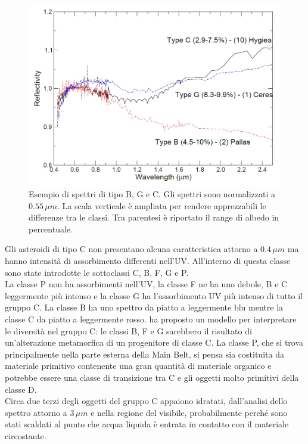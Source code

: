 \documentclass[a4paper,11pt,openright]{book}
\begin{document}
\begin{figure}[!h]
    \centering
    \includegraphics[scale=0.3]{figure/spettro_bgc.jpg}
    \caption[Esempio di spettri di tipo B, G e C.]{Esempio di spettri di tipo B, G e C. Gli spettri sono normalizzati a $0.55\,\mu m$. La scala verticale è ampliata per rendere apprezzabili le differenze tra le classi. Tra parentesi è riportato il range di albedo in percentuale. \citep{magrin_spectroscopic_nodate}}
    \label{spettro_bgc}
\end{figure}

Gli asteroidi di tipo C non presentano alcuna caratteristica attorno a $0.4\,\mu m$ ma hanno intensità di assorbimento differenti nell'UV. All'interno di questa classe sono state introdotte le sottoclassi C, B, F, G e P.\\
La classe P non ha assorbimenti nell'UV, la classe F ne ha uno debole, B e C leggermente più intenso e la classe G ha l'assorbimento UV più intenso di tutto il gruppo C. La classe B ha uno spettro da piatto a leggermente blu mentre la classe C da piatto a leggermente rosso. \citet{bell_asteroids_1989} ha proposto un modello per interpretare le diversità nel gruppo C: le classi B, F e G sarebbero il risultato di un'alterazione metamorfica di un progenitore di classe C. La classe P, che si trova principalmente nella parte esterna della Main Belt, si pensa sia costituita da materiale primitivo contenente una gran quantità di materiale organico e potrebbe essere una classe di transizione tra C e gli oggetti molto primitivi della classe D.\\
Circa due terzi degli oggetti del gruppo C appaiono idratati, dall'analisi dello spettro attorno a $3\,\mu m$ e nella regione del visibile, probabilmente perché sono stati scaldati al punto che acqua liquida è entrata in contatto con il materiale circostante.
\end{document}
